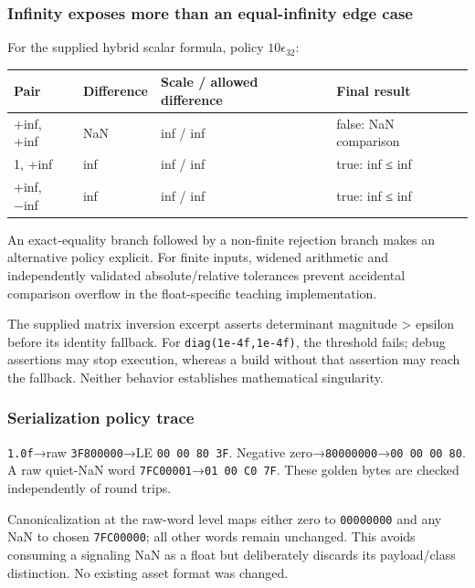 \subsubsection{Infinity exposes more than an equal-infinity edge case}\label{appendix-92ff77d4dfdc-infinity-exposes-more-than-an-equal-infinity-edge-case}

For the supplied hybrid scalar formula, policy \(10\epsilon_{32}\):

{\def\LTcaptype{none} %
\begin{longtable}[]{@{}llll@{}}
\toprule\noalign{}
Pair & Difference & Scale / allowed difference & Final result \\
\midrule\noalign{}
\endhead
\bottomrule\noalign{}
\endlastfoot
+inf, +inf & NaN & inf / inf & false: NaN comparison \\
1, +inf & inf & inf / inf & true: inf ≤ inf \\
+inf, −inf & inf & inf / inf & true: inf ≤ inf \\
\end{longtable}
}

An exact-equality branch followed by a non-finite rejection branch makes an alternative policy explicit. For finite inputs, widened arithmetic and independently validated absolute/relative tolerances prevent accidental comparison overflow in the float-specific teaching implementation.

The supplied matrix inversion excerpt asserts determinant magnitude \textgreater{} epsilon before its identity fallback. For \texttt{diag(1e-4f,1e-4f)}, the threshold fails; debug assertions may stop execution, whereas a build without that assertion may reach the fallback. Neither behavior establishes mathematical singularity.

\subsubsection{Serialization policy trace}\label{appendix-92ff77d4dfdc-serialization-policy-trace}

\texttt{1.0f}→raw \texttt{3F800000}→LE \texttt{00\ 00\ 80\ 3F}. Negative zero→\texttt{80000000}→\texttt{00\ 00\ 00\ 80}. A raw quiet-NaN word \texttt{7FC00001}→\texttt{01\ 00\ C0\ 7F}. These golden bytes are checked independently of round trips.

Canonicalization at the raw-word level maps either zero to \texttt{00000000} and any NaN to chosen \texttt{7FC00000}; all other words remain unchanged. This avoids consuming a signaling NaN as a float but deliberately discards its payload/class distinction. No existing asset format was changed.

